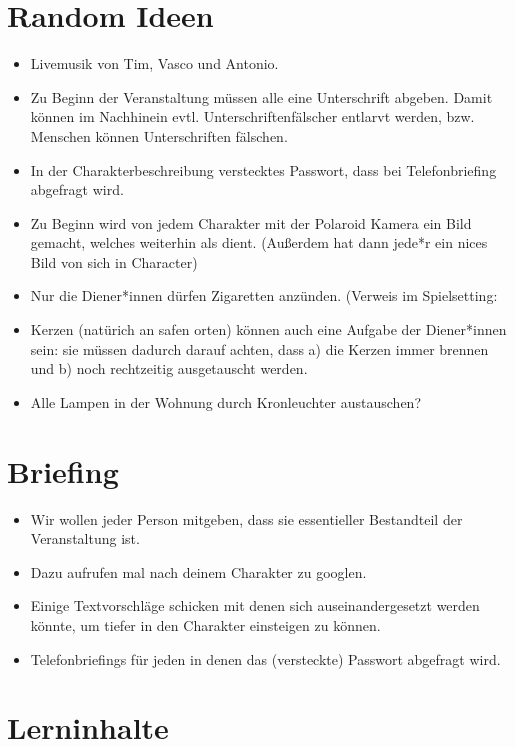 \documentclass[12pt, a4paper, openany]{report}
\begin{document}
\chapter{Random Ideen}
\begin{itemize}
    \item Livemusik von Tim, Vasco und Antonio.
    \item Zu Beginn der Veranstaltung müssen alle eine Unterschrift abgeben. 
Damit können im Nachhinein evtl. Unterschriftenfälscher entlarvt werden, bzw. Menschen können Unterschriften fälschen.
    \item In der Charakterbeschreibung verstecktes Passwort, dass bei Telefonbriefing abgefragt wird.
    \item Zu Beginn wird von jedem Charakter mit der Polaroid Kamera ein Bild gemacht, welches weiterhin als  dient. (Außerdem hat dann jede*r ein nices Bild von sich in Character)
    \item Nur die Diener*innen dürfen Zigaretten anzünden. (Verweis im Spielsetting: 
    \item Kerzen (natürich an safen orten) können auch eine Aufgabe der Diener*innen sein: 
      sie müssen dadurch darauf achten, dass a) die Kerzen immer brennen und b) noch rechtzeitig ausgetauscht werden.
    \item Alle Lampen in der Wohnung durch Kronleuchter austauschen?
\end{itemize}

\chapter{Briefing}
\begin{itemize}
    \item Wir wollen jeder Person mitgeben, dass sie essentieller Bestandteil der Veranstaltung ist.
    \item Dazu aufrufen mal nach deinem Charakter zu googlen.
    \item Einige Textvorschläge schicken mit denen sich auseinandergesetzt werden könnte, um tiefer in den Charakter einsteigen zu können.
    \item Telefonbriefings für jeden in denen das (versteckte) Passwort abgefragt wird.
\end{itemize}

\chapter{Lerninhalte}
\end{document}
